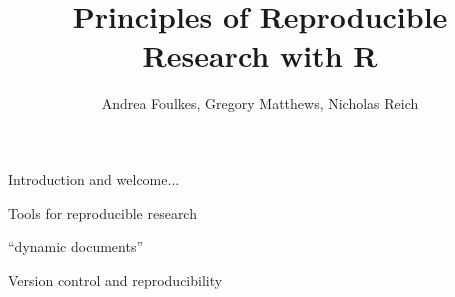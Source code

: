 

\title{Principles of Reproducible Research with R}
\newcommand{\ModuleShortname}{shortName}
\author{Andrea Foulkes, Gregory Matthews, Nicholas Reich}
\newcommand{\LicenseText}{Made available under the Creative Commons Attribution-ShareAlike 3.0 Unported License: http://creativecommons.org/licenses/by-sa/3.0/deed.en\textunderscore US }
\newcommand{\Instructor}{}
\newcommand{\Course}{Biostatistics in Practice: Research Training in High-Performance Computing with R}






\begin{frame}[plain]
	\titlepage
\end{frame}



\begin{frame}{Introduction and welcome...}

\end{frame}

\begin{frame}{Tools for reproducible research}

``dynamic documents''

\end{frame}


\begin{frame}{Version control and reproducibility}

\end{frame}

